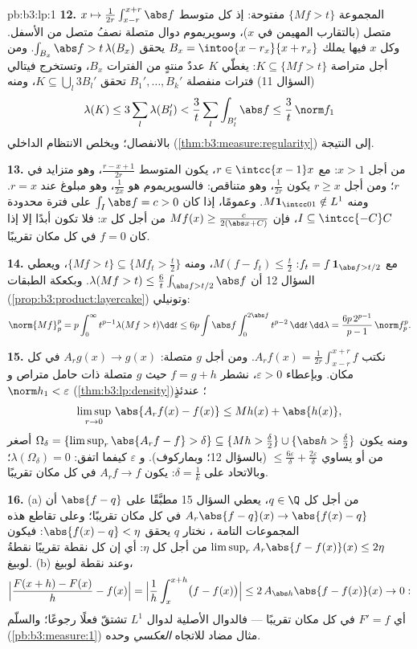 \begin{solution}{pb:b3:lp:1}
\textbf{12.} المجموعة $\{Mf > t\}$ مفتوحة: إذ كل متوسط $x \mapsto
\frac1{2r}\int_{x-r}^{x+r}\abs f$
متصل (بالتقارب المهيمن في $x$)، وسوپريموم دوال متصلة نصفُ متصل
من الأسفل. وكل $x$ فيها يملك $B_x =
\intoo{x-r_x}{x+r_x}$ يحقق $\int_{B_x}\abs f >
t\,\lambda(B_x)$. ومن أجل
متراصة $K \subseteq \{Mf > t\}$: يغطّي $K$ عددٌ منتهٍ من الفترات $B_x$، وتستخرج
فيتالي (السؤال 11) فترات منفصلة $B_1', \dots, B_k'$ تحقق $K \subseteq
\bigcup_l3B_l'$، ومنه
\[
\lambda(K) \leq 3\sum_l\lambda(B_l') <
\frac3t\sum_l\int_{B_l'}\abs f \leq \frac3t\,\norm f_1
\]
بالانفصال؛ ويخلص الانتظام الداخلي (\cref{thm:b3:measure:regularity}) إلى النتيجة.

\textbf{13.} من أجل $x > 1$: مع $r \in \intcc{x-1}x$، يكون المتوسط $\frac{r - x + 1}{2r}$،
وهو متزايد في $r$؛ ومن أجل $r
\geq x$ يكون $\frac1{2r}$، وهو
متناقص: فالسوپريموم هو $\frac1{2x}$، وهو مبلوغ عند $r = x$.
ومنه $M\mathbf 1_{\intcc01}
\notin L^1$. وعمومًا، إذا كان $\int_I\abs f = c > 0$ على فترة محدودة $I \subseteq \intcc{-C}C$،
فإن $Mf(x) \geq
\frac{c}{2(\abs x + C)}$ من أجل كل $x$: فلا تكون  أبدًا إلا إذا
كان $f = 0$ في كل مكان تقريبًا.

\textbf{14.} مع $f_t = f\,\mathbf 1_{\abs f > t/2}$: $M(f - f_t) \leq \frac t2$، ومنه $\{Mf > t\} \subseteq \{Mf_t
> \frac t2\}$، ويعطي السؤال 12
أن $\lambda(Mf > t) \leq
\frac6t\int_{\abs f > t/2}\abs f$. وبكعكة الطبقات (\cref{prop:b3:product:layercake}) وتونيلي:
\[
\norm{Mf}_p^p = p\int_0^\infty t^{p-1}\lambda(Mf > t)\dd t
\leq 6p\int\abs f\int_0^{2\abs f}t^{p-2}\,\dd t\,\dd\lambda
= \frac{6p\,2^{p-1}}{p-1}\,\norm f_p^p .
\]

\textbf{15.} نكتب $A_rf(x) = \frac1{2r}\int_{x-r}^{x+r}f$. ومن أجل $g$ متصلة: $A_rg(x) \to g(x)$ في كل
مكان. وبإعطاء $\varepsilon > 0$، نشطر $f = g + h$ حيث $g$ متصلة ذات حامل
متراص و $\norm h_1 < \varepsilon$ (\cref{thm:b3:lp:density})؛ عندئذٍ
\[
\limsup_{r\to0}\,\abs{A_rf(x) - f(x)} \leq Mh(x) +
\abs{h(x)},
\]
ومنه يكون  $\Omega_\delta = \{\limsup_r\abs{A_rf - f} > \delta\}
\subseteq \{Mh > \tfrac\delta2\} \cup \{\abs h >
\tfrac\delta2\}$ أصغر من أو يساوي $\leq \frac{6\varepsilon}\delta
+ \frac{2\varepsilon}\delta$ (بالسؤال 12؛
وبماركوف). و $\varepsilon$ كيفما اتفق: $\lambda(\Omega_\delta) = 0$؛ وبالاتحاد على
$\delta = \frac1k$: يكون $A_rf \to f$ في كل مكان تقريبًا.

\textbf{16.} (a) من أجل كل $q \in \Q$، يعطي السؤال 15 مطبَّقًا
على $\abs{f - q}$ أن $A_r\abs{f - q}(x) \to \abs{f(x) - q}$ في كل مكان تقريبًا؛ وعلى تقاطع هذه
المجموعات التامة ، نختار $q$ يحقق $\abs{f(x) - q} < \eta$: فيكون $\limsup_rA_r\abs{f - f(x)}(x) \leq 2\eta$
من أجل كل $\eta$: أي إن كل نقطة تقريبًا نقطةُ لوبيغ. (b) وعند
نقطة لوبيغ،
\[
\Bigl|\frac{F(x + h) - F(x)}h - f(x)\Bigr|
= \Bigl|\frac1h\int_x^{x+h}\bigl(f - f(x)\bigr)\Bigr|
\leq 2\,A_{\abs h}\abs{f - f(x)}(x) \to 0 :
\]
أي $F' = f$ في كل مكان تقريبًا --- فالدوال الأصلية لدوال $L^1$
تشتقّ فعلًا رجوعًا؛ والسلّم (\cref{pb:b3:measure:1}) مثال مضاد للاتجاه
\emph{العكسي} وحده.


\end{solution}
